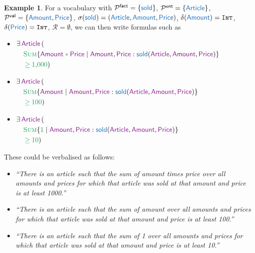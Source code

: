 \documentclass[11pt]{amsart}
\theoremstyle{definition}
\newtheorem{example}{Example}
\theoremstyle{remark}
\newcommand{\Preds}{\mathcal{P}}
\newcommand{\EntPreds}{\Preds^{\textsf{ent}}}
\newcommand{\ValPreds}{\Preds^{\textsf{val}}}
\newcommand{\FactPreds}{\Preds^{\textsf{fact}}}
\newcommand{\RefSchemes}{\mathcal{R}}
\newcommand{\pr}[1]{\mathsf{\textcolor{RoyalBlue}{#1}}}
\newcommand{\var}[1]{\mathsf{\textcolor{Plum}{#1}}}
\newcommand{\tp}[1]{\texttt{\textsc{#1}}}
\newcommand{\dataOp}[1]{\mathbin{\textcolor{ForestGreen}{#1}}}
\newcommand{\dataFun}[1]{\textcolor{ForestGreen}{\textsc{#1}}}
\newcommand{\dataVal}[1]{\textcolor{ForestGreen}{#1}}
\begin{document}
\begin{example}
For a vocabulary with $\FactPreds = \{ \pr{sold} \}$, $\EntPreds = \{ \pr{Article} \}$, $\ValPreds = \{ \pr{Amount}, \pr{Price} \}$, $\sigma(\pr{sold}) = (\pr{Article}, \pr{Amount}, \pr{Price})$, 
$\delta(\pr{Amount}) = \tp{Int}$, $\delta(\pr{Price}) = \tp{Int}$, $\RefSchemes = \emptyset$, we can then write formulas such as

\begin{itemize}

  \item $\begin{aligned}[t]
    & \exists \, \var{Article} \, ( \\
     & \quad \dataFun{Sum} \{ \var{Amount} \dataOp{*} \var{Price} \mid \var{Amount}, \var{Price} : \pr{sold}(\var{Article}, \var{Amount}, \var{Price}) \} \\
    & \quad \dataOp{\geq} \dataVal{1{,}000} )
    \end{aligned}$

  \item $\begin{aligned}[t]
    &\exists \, \var{Article} \, ( \\ 
    & \quad \dataFun{Sum} \{ \var{Amount} \mid \var{Amount}, \var{Price} : \pr{sold}(\var{Article}, \var{Amount}, \var{Price}) \} \\
    & \quad \dataOp{\geq} \dataVal{100} )
    \end{aligned}$
    
  \item $\begin{aligned}[t]
    &\exists \, \var{Article} \, ( \\
     & \quad \dataFun{Sum} \{ \dataVal{1} \mid \var{Amount}, \var{Price} : \pr{sold}(\var{Article}, \var{Amount}, \var{Price}) \} \\
    &\quad \dataOp{\geq} \dataVal{10} )
    \end{aligned}$
    
 \end{itemize}

These could be verbalised as follows:
\begin{itemize}
  \item \emph{``There is an article such that the sum of amount times price over all amounts and prices for which that article was sold at that amount and price is at least 1000.''}
  \item \emph{``There is an article such that the sum of amount over all amounts and prices for which that article was sold at that amount and price is at least 100.''}
  \item \emph{``There is an article such that the sum of 1 over all amounts and prices for which that article was sold at that amount and price is at least 10.''}
 \end{itemize} 
\end{example}
\end{document}
